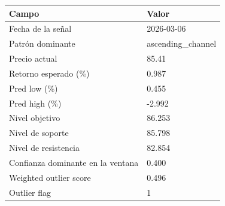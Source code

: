 \begin{tabular}{p{}p{}}
\toprule
                            Campo &             Valor \\
\midrule
                Fecha de la señal &        2026-03-06 \\
                 Patrón dominante & ascending\_channel \\
                    Precio actual &             85.41 \\
             Retorno esperado (\%) &             0.987 \\
                     Pred low (\%) &             0.455 \\
                    Pred high (\%) &            -2.992 \\
                   Nivel objetivo &            86.253 \\
                 Nivel de soporte &            85.798 \\
             Nivel de resistencia &            82.854 \\
Confianza dominante en la ventana &             0.400 \\
           Weighted outlier score &             0.496 \\
                     Outlier flag &                 1 \\
\bottomrule
\end{tabular}
